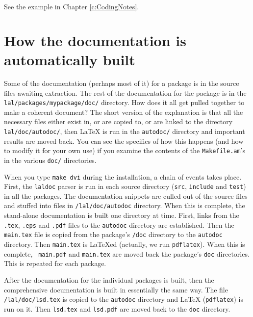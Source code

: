 \documentclass[oneside]{book}
\begin{document}
See the example in Chapter \ref{c:CodingNotes}.


\section{How the documentation is automatically built}

Some of the documentation (perhaps most of it)  for a package is in
the source files awaiting extraction.  The rest of the documentation
for the package is in the {\tt lal/packages/mypackage/doc/} directory.
How does it all get pulled together to make a coherent document?  The
short version of the explanation is that all the necessary files
either exist in, or are copied to, or are linked to the directory {\tt
lal/doc/autodoc/}, then {\LaTeX} is run in the {\tt autodoc/} directory
and important results are moved back.  You can see the specifics of
how this happens (and how to modify it for your own use) if you examine
the contents of the {\tt Makefile.am}'s in the various {\tt doc/}
directories.

When  you type {\tt make dvi} during the installation, a chain of
events takes place. First, the {\tt laldoc} parser is run in each
source directory ({\tt src}, {\tt include} and {\tt test}) in all the
packages.  The documentation snippets are culled out of the source
files and stuffed into files in {\tt /lal/doc/autodoc} directory. When
this is complete, the stand-alone documentation is built one directory
at time.  First, links from the {\tt .tex}, {\tt .eps} and {\tt .pdf}
files to the {\tt autodoc} directory are established.  Then the {\tt
main.tex} file is copied from the package's  {\tt /doc} directory to
the {\tt autodoc} directory. Then {\tt main.tex} is {\LaTeX}ed
(actually, we run {\tt pdflatex}). When this is complete, {\tt
main.pdf}  and {\tt main.tex} are moved back the package's {\tt doc}
directories.  This is repeated for each package.

After the documentation for the individual packages is built, then the
comprehensive documentation is built in essentially the same way.  The
file {\tt /lal/doc/lsd.tex} is copied to the {\tt autodoc} directory
and {\LaTeX}  ({\tt pdflatex}) is run on it. Then  {\tt lsd.tex} and
{\tt lsd.pdf} are moved back to the {\tt doc} directory.



\backmatter
\pagebreak
\renewcommand{\bookname}{\relax}
%
\nopagebreak
\printindex
\end{document}
